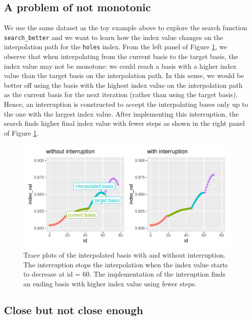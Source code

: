 \documentclass[12pt]{article}
\begin{document}
\hypertarget{a-problem-of-not-monotonic}{%
\subsection{A problem of not monotonic}\label{a-problem-of-not-monotonic}}

We use the same dataset as the toy example above to explore the search function \texttt{search\_better} and we want to learn how the index value changes on the interpolation path for the \texttt{holes} index. From the left panel of Figure \ref{interruption}, we observe that when interpolating from the current basis to the target basis, the index value may not be monotone: we could reach a basis with a higher index value than the target basis on the interpolation path. In this sense, we would be better off using the basis with the highest index value on the interpolation path as the current basis for the next iteration (rather than using the target basis). Hence, an interruption is constructed to accept the interpolating bases only up to the one with the largest index value. After implementing this interruption, the search finds higher final index value with fewer steps as shown in the right panel of Figure \ref{interruption}.

\begin{figure}
\centering
\includegraphics{paper_files/figure-latex/interruption-1.pdf}
\caption{\label{fig:interruption}\label{interruption}Trace plots of the interpolated basis with and without interruption. The interruption stops the interpolation when the index value starts to decrease at id = 60. The implementation of the interuption finds an ending basis with higher index value using fewer steps.}
\end{figure}

\hypertarget{close-but-not-close-enough}{%
\subsection{Close but not close enough}\label{close-but-not-close-enough}}
\end{document}
